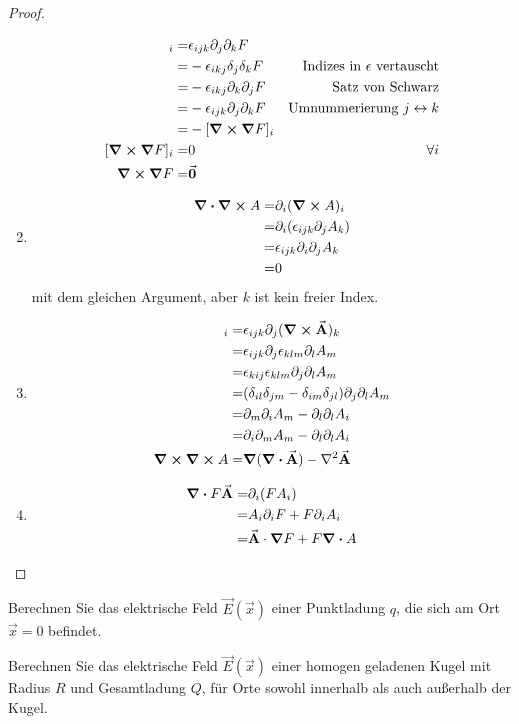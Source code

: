 \begin{proof}
\begin{parts}
\begin{enumerate}[label=(\roman*)]
\begin{align*}
				[\curl{\grad{F}}]_i=&\epsilon_{ijk}\partial_j \partial_k F\\
				=&-\epsilon_{ikj}\delta_j\delta_k F & \text{Indizes in }\epsilon\text{ vertauscht}\\
				=&-\epsilon_{ikj}\partial_k\partial_j F &\text{Satz von Schwarz}\\
				=&-\epsilon_{ijk}\partial_j\partial_k F & \text{Umnummerierung }j\leftrightarrow k\\
				=&-[\curl{\grad{F}}]_i\\
				[\curl{\grad{F}}]_i=&0&\forall i\\
				\curl{\grad{F}}=&\va 0
			\end{align*}
		\item 
			\begin{align*}
				\div{\curl{A}}=&\partial_i(\curl{A})_i\\
				=&\partial_i(\epsilon_{ijk}\partial_jA_k)\\
				=&\epsilon_{ijk}\partial_i\partial_j A_k\\
				=&0
			\end{align*}
			mit dem gleichen Argument, aber $k$ ist kein freier Index.
		\item 
			\begin{align*}
				[\curl{\curl{\va A}}]_i=& \epsilon_{ijk}\partial_j (\curl{\va A})_k\\
				=&\epsilon_{ijk}\partial_j\epsilon_{klm}\partial_l A_m\\
				=&\epsilon_{kij}\epsilon_{klm}\partial_j\partial_l A_m\\
				=&(\delta_{il}\delta_{jm}-\delta_{im}\delta_{jl})\partial_j\partial_l A_m\\
				=&\partial_m\partial_i A_m - \partial_l\partial_l A_i\\
				=& \partial_i\partial_m A_m - \partial_l \partial_l A_i\\
				\curl{\curl{A}}=&\grad{(\div{\va A})}-\laplacian{\va A}
			\end{align*}
		\item 
			\begin{align*}
				\div{F\va A}=&\partial_i(F A_i)\\
				=&A_i\partial_i F+F\partial_i A_i\\
				=&\va A\cdot\grad{F}+F\div{A}
			\end{align*}
	\end{enumerate}
	\end{parts}
\end{proof}
\begin{Problem}
\begin{parts}
\item Berechnen Sie das elektrische Feld $\vec E(\vec x)$ einer Punktladung $q$, die sich am Ort $\vec{x} = 0$ befindet.		
\item Berechnen Sie das elektrische Feld $\vec E(\vec x)$ einer homogen geladenen Kugel mit Radius $R$ und Gesamtladung $Q$, für Orte sowohl innerhalb als auch außerhalb der Kugel. 
\end{parts}
\end{Problem}

